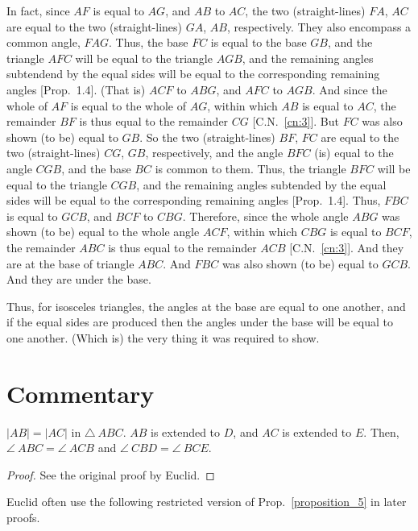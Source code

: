 In fact, since $AF$ is equal to $AG$, and $AB$ to $AC$, the two (straight-lines) $FA$, $AC$ are
equal to the two (straight-lines) $GA$, $AB$, respectively. They also encompass a
common angle, $FAG$. Thus, the base $FC$ is equal to the base $GB$, and the
triangle $AFC$ will be equal to the triangle $AGB$, and the remaining angles
subtendend by the equal sides will
be equal to the corresponding  remaining angles [Prop.~1.4].  (That is) $ACF$ to $ABG$, and $AFC$ to $AGB$. And since the whole of $AF$ is
equal to the whole of $AG$, within which $AB$ is equal to $AC$, the remainder
$BF$ is thus equal to the remainder $CG$ [C.N.~\ref{cn:3}]. But $FC$ was also shown (to be) equal to $GB$. So
the two (straight-lines) $BF$, $FC$ are equal to the two (straight-lines) $CG$, $GB$, respectively,
and the angle $BFC$ (is) equal to the angle $CGB$, and the base $BC$ is common to
them. Thus, the triangle $BFC$ will be equal to the triangle $CGB$, and
the remaining angles subtended by the equal sides will be equal to the corresponding remaining angles [Prop.~1.4]. Thus, $FBC$ is equal to $GCB$, and $BCF$ to
$CBG$. Therefore, since the whole angle $ABG$ was shown (to be) equal to the
whole angle $ACF$, within which $CBG$ is equal to $BCF$, the remainder $ABC$
is thus equal to the remainder $ACB$ [C.N.~\ref{cn:3}]. And they are at the base of triangle
$ABC$. And $FBC$ was also shown (to be) equal to $GCB$. And they are under
the base.

Thus, for isosceles triangles, the angles at the base are equal to one another, and if
the equal sides are produced then the angles under the base will be equal to one another. (Which is) the very thing it was required to show.



\section*{Commentary}

\begin{proposition}\label{proposition_5}\leanok
    $|AB| = |AC|$ in $\triangle~ABC$. $AB$ is extended to $D$, and $AC$ is extended to $E$. Then, $\angle~ABC = \angle~ACB$ and $\angle~CBD = \angle~BCE$.
\end{proposition}
\begin{proof}
    \leanok
    See the original proof by Euclid.
\end{proof}

Euclid often use the following restricted version of Prop.~\ref{proposition_5} in later proofs.

